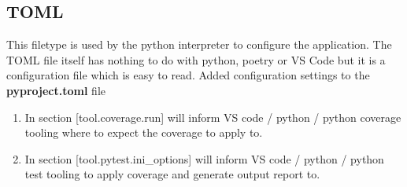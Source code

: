 \subsection{TOML}
This filetype is used by the python interpreter to configure the application. The TOML file itself has nothing to do with python, poetry or VS Code but it is a configuration file which is easy to read.
Added configuration settings to the \textbf{pyproject.toml} file
\begin{enumerate}
	\item In section [tool.coverage.run]  will inform VS code / python / python coverage tooling where to expect the coverage to apply to.
	\item In section [tool.pytest.ini\_options]  will inform VS code / python / python test tooling to apply coverage and generate output report to.
\end{enumerate}


